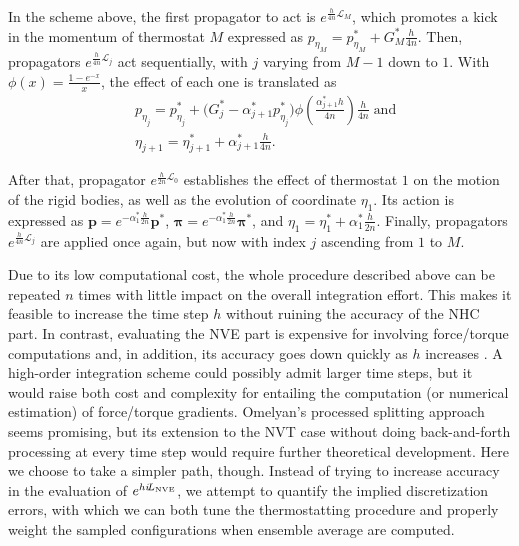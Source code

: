 \documentclass[
	aip,
	jcp,
	reprint,
]{revtex4-1}
\newcommand{\vt}[1]{\boldsymbol{\mathbf{#1}}}          %
\newcommand{\Liu}[1]{i\!L_\text{#1}}                   %
\newcommand{\timestep}{h}
\begin{document}
In the scheme above, the first propagator to act is $e^{\frac{\timestep}{4n} \mathcal{L}_M}$, which promotes a kick in the momentum of thermostat $M$ expressed as $p_{\eta_M} = p_{\eta_M}^\ast + G_M^\ast \frac{\timestep}{4n}$.
Then, propagators $e^{\frac{\timestep}{4n} \mathcal{L}_j}$ act sequentially, with $j$ varying from $M-1$ down to $1$.
With $\phi(x) = \frac{1-e^{-x}}{x}$, the effect of each one is translated as \cite{Martyna_1996}
\begin{align*}
&p_{\eta_j} = p_{\eta_j}^\ast + \Big( G_j^\ast - \alpha_{j+1}^\ast p_{\eta_j}^\ast \Big) \phi\left(\frac{\alpha_{j+1}^\ast \timestep}{4n}\right) \frac{\timestep}{4n} \; \text{and} \\
&\eta_{j+1} = \eta_{j+1}^\ast + \alpha_{j+1}^\ast \frac{\timestep}{4n}.
\end{align*}

After that, propagator $e^{\frac{\timestep}{2n} \mathcal{L}_0}$ establishes the effect of thermostat $1$ on the motion of the rigid bodies, as well as the evolution of coordinate $\eta_1$.
Its action is expressed as ${\vt p} = e^{-\alpha_1^\ast \frac{\timestep}{2n}} {\vt p}^\ast$, ${\vt \pi} = e^{-\alpha_1^\ast \frac{\timestep}{2n}} {\vt \pi}^\ast$, and $\eta_1 = \eta_1^\ast + \alpha_1^\ast \frac{\timestep}{2n}$.
Finally, propagators $e^{\frac{\timestep}{4n} \mathcal{L}_j}$ are applied once again, but now with index $j$ ascending from $1$ to $M$.

Due to its low computational cost, the whole procedure described above can be repeated $n$ times with little impact on the overall integration effort.
This makes it feasible to increase the time step $\timestep$ without ruining the accuracy of the NHC part.
In contrast, evaluating the NVE part is expensive for involving force/torque computations and, in addition, its accuracy goes down quickly as $\timestep$ increases \cite{Davidchack_2010, Silveira_2017}.
A high-order integration scheme\cite{Omelyan_2007, Van_zon_2008} could possibly admit larger time steps, but it would raise both cost and complexity for entailing the computation (or numerical estimation) of force/torque gradients.
Omelyan's processed splitting approach \cite{Omelyan_2008} seems promising, but its extension to the NVT case without doing back-and-forth processing at every time step would require further theoretical development.
Here we choose to take a simpler path, though.
Instead of trying to increase accuracy in the evaluation of $e^{\timestep \Liu{\tiny NVE}}$, we attempt to quantify the implied discretization errors, with which we can both tune the thermostatting procedure and properly weight the sampled configurations when ensemble average are computed.
\end{document}
